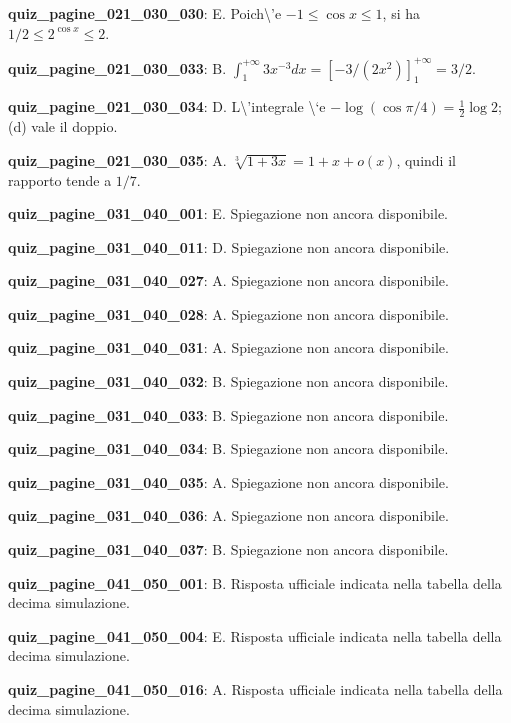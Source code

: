 \documentclass[11pt,a4paper]{article}
\newcounter{quiz}
\begin{document}
\noindent\textbf{quiz\_pagine\_021\_030\_030}: E. Poich\textbackslash{}'e $-1\le\cos x\le1$, si ha $1/2\le2^{\cos x}\le2$.\par\medskip
\noindent\textbf{quiz\_pagine\_021\_030\_033}: B. $\int_1^{+\infty}3x^{-3}dx=[-3/(2x^2)]_1^{+\infty}=3/2$.\par\medskip
\noindent\textbf{quiz\_pagine\_021\_030\_034}: D. L\textbackslash{}'integrale \textbackslash{}`e $-\log(\cos\pi/4)=\frac12\log2$; (d) vale il doppio.\par\medskip
\noindent\textbf{quiz\_pagine\_021\_030\_035}: A. $\sqrt[3]{1+3x}=1+x+o(x)$, quindi il rapporto tende a $1/7$.\par\medskip
\noindent\textbf{quiz\_pagine\_031\_040\_001}: E. Spiegazione non ancora disponibile.\par\medskip
\noindent\textbf{quiz\_pagine\_031\_040\_011}: D. Spiegazione non ancora disponibile.\par\medskip
\noindent\textbf{quiz\_pagine\_031\_040\_027}: A. Spiegazione non ancora disponibile.\par\medskip
\noindent\textbf{quiz\_pagine\_031\_040\_028}: A. Spiegazione non ancora disponibile.\par\medskip
\noindent\textbf{quiz\_pagine\_031\_040\_031}: A. Spiegazione non ancora disponibile.\par\medskip
\noindent\textbf{quiz\_pagine\_031\_040\_032}: B. Spiegazione non ancora disponibile.\par\medskip
\noindent\textbf{quiz\_pagine\_031\_040\_033}: B. Spiegazione non ancora disponibile.\par\medskip
\noindent\textbf{quiz\_pagine\_031\_040\_034}: B. Spiegazione non ancora disponibile.\par\medskip
\noindent\textbf{quiz\_pagine\_031\_040\_035}: A. Spiegazione non ancora disponibile.\par\medskip
\noindent\textbf{quiz\_pagine\_031\_040\_036}: A. Spiegazione non ancora disponibile.\par\medskip
\noindent\textbf{quiz\_pagine\_031\_040\_037}: B. Spiegazione non ancora disponibile.\par\medskip
\noindent\textbf{quiz\_pagine\_041\_050\_001}: B. Risposta ufficiale indicata nella tabella della decima simulazione.\par\medskip
\noindent\textbf{quiz\_pagine\_041\_050\_004}: E. Risposta ufficiale indicata nella tabella della decima simulazione.\par\medskip
\noindent\textbf{quiz\_pagine\_041\_050\_016}: A. Risposta ufficiale indicata nella tabella della decima simulazione.\par\medskip
\end{document}
